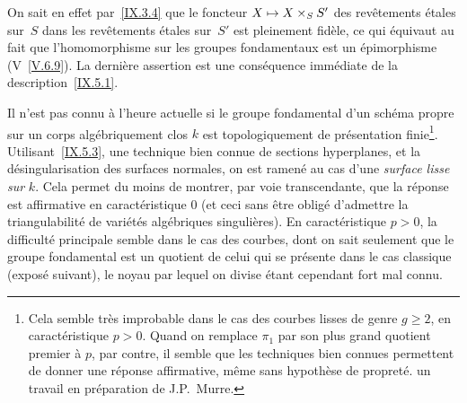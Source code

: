 On sait en effet par~\ref{IX.3.4} que le foncteur $X\mto
X\times_SS'$ des rev\^etements \'etales sur~$S$ dans les
rev\^etements \'etales sur~$S'$ est pleinement fid\`ele, ce qui
\'equivaut au fait que l'homomorphisme sur les groupes fondamentaux
est un \'epimorphisme (V~\ref{V.6.9}). La derni\`ere assertion est
une cons\'equence imm\'ediate de la description~\ref{IX.5.1}.

\begin{remarque}
\label{IX.5.7}
Il n'est pas connu \`a l'heure actuelle si le groupe fondamental
d'un sch\'ema propre sur un corps alg\'ebriquement clos $k$ est
topologiquement de pr\'esentation finie\footnote{Cela semble
tr\`es improbable dans le cas des courbes lisses de genre $g\geq 2$,
en caract\'eristique $p>0$. Quand on remplace $\pi_1$ par son plus
grand quotient premier \`a $p$, par contre, il semble que les
techniques bien connues permettent de donner une r\'eponse
affirmative, m\^eme sans hypoth\`ese de propret\'e. \Cf un
travail en pr\'eparation de J.P.\, Murre.}. Utilisant~\ref{IX.5.3}, une
technique bien connue de sections hyperplanes, et la
d\'esingularisation des surfaces normales, on est ramen\'e au cas
d'une \emph{surface lisse sur} $k$. Cela permet du moins de montrer,
par voie transcendante, que la r\'eponse est affirmative en
caract\'eristique $0$ (et ceci sans \^etre oblig\'e d'admettre
la triangulabilit\'e de vari\'et\'es alg\'ebriques
singuli\`eres). En caract\'eristique $p>0$, la difficult\'e
principale semble dans le cas des courbes, dont on sait seulement que
le groupe fondamental est un quotient de celui qui se pr\'esente
dans le cas classique (\cf expos\'e suivant), le noyau par lequel on
divise \'etant cependant fort mal connu.
\end{remarque}

